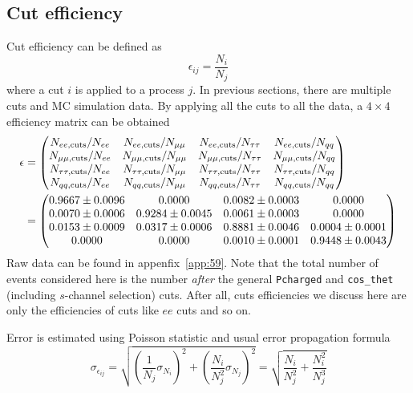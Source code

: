 \subsection{Cut efficiency}
Cut efficiency can be defined as
\begin{equation}
	\epsilon_{ij} = \frac{N_i}{N_j}
\end{equation}
where a cut $i$ is applied to a process $j$. In previous sections, there are multiple cuts and MC simulation data. By applying all the cuts to all the data, a $4\times4$ efficiency matrix can be obtained
\begin{align}
	\mathbf{\epsilon} &= \begin{pmatrix} N_{ee, \text{cuts}}/N_{ee} & N_{ee, \text{cuts}}/N_{\mu\mu} & N_{ee, \text{cuts}}/N_{\tau\tau} & N_{ee, \text{cuts}}/N_{qq} \\ 
	N_{\mu\mu, \text{cuts}}/N_{ee} & N_{\mu\mu, \text{cuts}}/N_{\mu\mu} & N_{\mu\mu, \text{cuts}}/N_{\tau\tau} & N_{\mu\mu, \text{cuts}}/N_{qq} \\ 
	N_{\tau\tau, \text{cuts}}/N_{ee} & N_{\tau\tau, \text{cuts}}/N_{\mu\mu} & N_{\tau\tau, \text{cuts}}/N_{\tau\tau}  &N_{\tau\tau, \text{cuts}}/N_{qq} \\ 
	N_{qq, \text{cuts}}/N_{ee} & N_{qq, \text{cuts}}/N_{\mu\mu} & N_{qq, \text{cuts}}/N_{\tau\tau}  &N_{qq, \text{cuts}}/N_{qq} 
\end{pmatrix} \label{math:epsFor}\\
							&= \begin{pmatrix} \num{0.9667 +- 0.0096} & \num{0.0000 +- 0.0000} & \num{0.0082 +- 0.0003} & \num{0.0000 +- 0.0000} \\ 
								\num{0.0070 +- 0.0006} & \num{0.9284 +- 0.0045} & \num{0.0061 +- 0.0003} & \num{0.0000 +- 0.0000} \\
								\num{0.0153 +- 0.0009} & \num{0.0317 +- 0.0006} & \num{0.8881 +- 0.0046} & \num{0.0004 +- 0.0001} \\
								\num{0.0000 +- 0.0000} & \num{0.0000 +- 0.0000} & \num{0.0010 +- 0.0001} & \num{0.9448 +- 0.0043} 
	\end{pmatrix}\notag
\end{align}
Raw data can be found in appenfix~\ref{app:59}. Note that the total number of events considered here is the number \textit{after} the general \verb|Pcharged| and \verb|cos_thet| (including $s$-channel selection) cuts. After all, cuts efficiencies we discuss here are only the efficiencies of cuts like $ee$ cuts and so on.

Error is estimated using Poisson statistic and usual error propagation formula
\begin{equation*}
	\sigma_{\epsilon_{ij}} = \sqrt{ \left(\frac{1}{N_j} \sigma_{N_i} \right)^2 + \left(\frac{N_i}{N_j^2} \sigma_{N_j}\right)^2  }  = \sqrt{ \frac{N_i}{N_j^2} + \frac{N_i^2}{N_j^3} }
\end{equation*}

